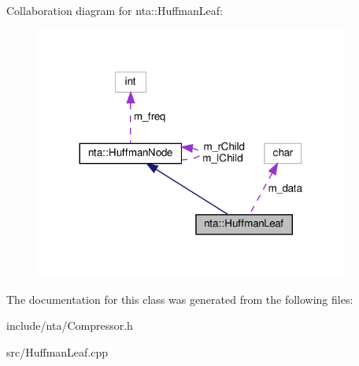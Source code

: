 Collaboration diagram for nta\+:\+:Huffman\+Leaf\+:\nopagebreak
\begin{figure}[H]
\begin{center}
\leavevmode
\includegraphics[width=293pt]{d7/d69/classnta_1_1HuffmanLeaf__coll__graph}
\end{center}
\end{figure}


The documentation for this class was generated from the following files\+:\begin{DoxyCompactItemize}
\item 
include/nta/Compressor.\+h\item 
src/Huffman\+Leaf.\+cpp\end{DoxyCompactItemize}
